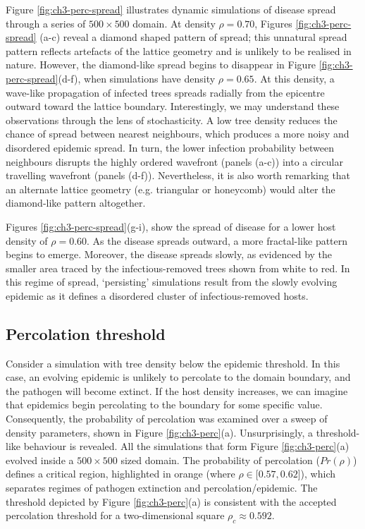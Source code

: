 Figure \ref{fig:ch3-perc-spread} illustrates dynamic simulations of disease spread through a series of $500 \times 500 $ domain. At density $\rho=0.70$, Figures \ref{fig:ch3-perc-spread} (a-c) reveal a diamond shaped pattern of spread; this unnatural spread pattern reflects artefacts of the lattice geometry and is unlikely to be realised in nature.
However, the diamond-like spread begins to disappear in Figure \ref{fig:ch3-perc-spread}(d-f), when simulations have density $\rho=0.65$. At this density, a wave-like propagation of infected trees spreads radially from the epicentre outward toward the lattice boundary. Interestingly, we may understand these observations through the lens of stochasticity. A low tree density reduces the chance of spread between nearest neighbours, which produces a more noisy and disordered epidemic spread. In turn, the lower infection probability between neighbours disrupts the highly ordered wavefront (panels (a-c)) into a circular travelling wavefront (panels (d-f)). Nevertheless, it is also worth remarking that an alternate lattice geometry (e.g. triangular or honeycomb) would alter the diamond-like pattern altogether. 

Figures \ref{fig:ch3-perc-spread}(g-i), show the spread of disease for a lower host density of $\rho = 0.60$.
As the disease spreads outward, a more fractal-like pattern begins to emerge.
Moreover, the disease spreads slowly, as evidenced by the smaller area traced by the infectious-removed trees shown from white to red.
In this regime of spread, `persisting' simulations result from the slowly evolving epidemic as it defines a disordered cluster of infectious-removed hosts.
\newpage

\subsection{Percolation threshold}
\label{section:universality}

Consider a simulation with tree density below the epidemic threshold. In this case, an evolving epidemic is unlikely to percolate to the domain boundary, and the pathogen will become extinct. If the host density increases, we can imagine that epidemics begin percolating to the boundary for some specific value.
Consequently, the probability of percolation was examined over a sweep of density parameters, shown in Figure \ref{fig:ch3-perc}(a).
Unsurprisingly, a threshold-like behaviour is revealed. All the simulations that form Figure \ref{fig:ch3-perc}(a) evolved inside a $500\times 500$ sized domain.
The probability of percolation ($Pr(\rho)$) defines a critical region, highlighted in orange (where $ \rho \in [0.57, 0.62$]), which separates regimes of pathogen extinction and percolation/epidemic. The threshold depicted by Figure \ref{fig:ch3-perc}(a) is consistent with the accepted percolation threshold for a two-dimensional square $\rho_c \approx 0.592$.

